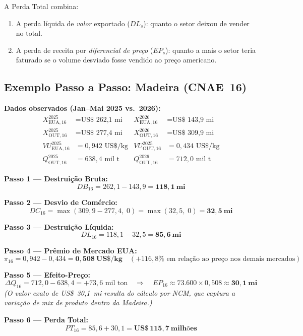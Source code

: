 \documentclass[12pt, a4paper]{article}
\begin{document}
A Perda Total combina:
\begin{enumerate}[noitemsep]
  \item A perda líquida de \emph{valor} exportado ($DL_s$):
    quanto o setor deixou de vender no total.
  \item A perda de receita por \emph{diferencial de preço} ($EP_s$):
    quanto a mais o setor teria faturado se o volume desviado
    fosse vendido ao preço americano.
\end{enumerate}

\subsection{Exemplo Passo a Passo: Madeira (CNAE~16)}

\begin{exemplobox}
\small
\textbf{Dados observados (Jan--Mai 2025 vs.\ 2026):}
\begin{align*}
  X_{\text{EUA},16}^{2025} &= \text{US\$~262,1~mi} &
  X_{\text{EUA},16}^{2026} &= \text{US\$~143,9~mi} \\
  X_{\text{OUT},16}^{2025} &= \text{US\$~277,4~mi} &
  X_{\text{OUT},16}^{2026} &= \text{US\$~309,9~mi} \\
  VU_{\text{EUA},16}^{2025} &= 0{,}942 \text{ US\$/kg} &
  VU_{\text{OUT},16}^{2025} &= 0{,}434 \text{ US\$/kg} \\
  Q_{\text{OUT},16}^{2025} &= 638{,}4\text{ mil t} &
  Q_{\text{OUT},16}^{2026} &= 712{,}0\text{ mil t}
\end{align*}

\medskip
\textbf{Passo 1 --- Destruição Bruta:}
\[
  DB_{16} = 262{,}1 - 143{,}9 = \mathbf{118{,}1\ \text{mi}}
\]

\textbf{Passo 2 --- Desvio de Comércio:}
\[
  DC_{16} = \max(309{,}9 - 277{,}4,\;0) = \max(32{,}5,\;0) = \mathbf{32{,}5\ \text{mi}}
\]

\textbf{Passo 3 --- Destruição Líquida:}
\[
  DL_{16} = 118{,}1 - 32{,}5 = \mathbf{85{,}6\ \text{mi}}
\]

\textbf{Passo 4 --- Prêmio de Mercado EUA:}
\[
  \pi_{16} = 0{,}942 - 0{,}434 = \mathbf{0{,}508\ \text{US\$/kg}}
  \quad(+116{,}8\%\text{ em relação ao preço nos demais mercados})
\]

\textbf{Passo 5 --- Efeito-Preço:}
\[
  \Delta Q_{16} = 712{,}0 - 638{,}4 = +73{,}6\text{ mil ton}
  \quad\Rightarrow\quad
  EP_{16} \approx 73{.}600 \times 0{,}508 \approx \mathbf{30{,}1\ \text{mi}}
\]
\emph{(O valor exato de US\$~30,1~mi resulta do cálculo por NCM, que captura
a variação de mix de produto dentro da Madeira.)}

\textbf{Passo 6 --- Perda Total:}
\[
  PT_{16} = 85{,}6 + 30{,}1 = \mathbf{US\$\ 115{,}7\ \text{milhões}}
\]
\end{exemplobox}
\end{document}
